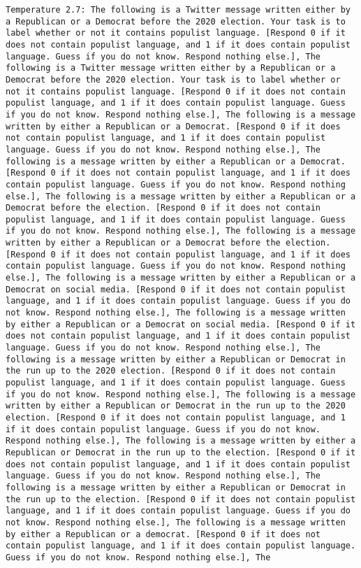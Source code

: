 \begin{lstlisting}[label=lst:poor_performing_prompts]
	Temperature 2.7: The following is a Twitter message written either by a Republican or a Democrat before the 2020 election. Your task is to label whether or not it contains populist language. [Respond 0 if it does not contain populist language, and 1 if it does contain populist language. Guess if you do not know. Respond nothing else.], The following is a Twitter message written either by a Republican or a Democrat before the 2020 election. Your task is to label whether or not it contains populist language. [Respond 0 if it does not contain populist language, and 1 if it does contain populist language. Guess if you do not know. Respond nothing else.], The following is a message written by either a Republican or a Democrat. [Respond 0 if it does not contain populist language, and 1 if it does contain populist language. Guess if you do not know. Respond nothing else.], The following is a message written by either a Republican or a Democrat. [Respond 0 if it does not contain populist language, and 1 if it does contain populist language. Guess if you do not know. Respond nothing else.], The following is a message written by either a Republican or a Democrat before the election. [Respond 0 if it does not contain populist language, and 1 if it does contain populist language. Guess if you do not know. Respond nothing else.], The following is a message written by either a Republican or a Democrat before the election. [Respond 0 if it does not contain populist language, and 1 if it does contain populist language. Guess if you do not know. Respond nothing else.], The following is a message written by either a Republican or a Democrat on social media. [Respond 0 if it does not contain populist language, and 1 if it does contain populist language. Guess if you do not know. Respond nothing else.], The following is a message written by either a Republican or a Democrat on social media. [Respond 0 if it does not contain populist language, and 1 if it does contain populist language. Guess if you do not know. Respond nothing else.], The following is a message written by either a Republican or Democrat in the run up to the 2020 election. [Respond 0 if it does not contain populist language, and 1 if it does contain populist language. Guess if you do not know. Respond nothing else.], The following is a message written by either a Republican or Democrat in the run up to the 2020 election. [Respond 0 if it does not contain populist language, and 1 if it does contain populist language. Guess if you do not know. Respond nothing else.], The following is a message written by either a Republican or Democrat in the run up to the election. [Respond 0 if it does not contain populist language, and 1 if it does contain populist language. Guess if you do not know. Respond nothing else.], The following is a message written by either a Republican or Democrat in the run up to the election. [Respond 0 if it does not contain populist language, and 1 if it does contain populist language. Guess if you do not know. Respond nothing else.], The following is a message written by either a Republican or a democrat. [Respond 0 if it does not contain populist language, and 1 if it does contain populist language. Guess if you do not know. Respond nothing else.], The 
\end{lstlisting}
